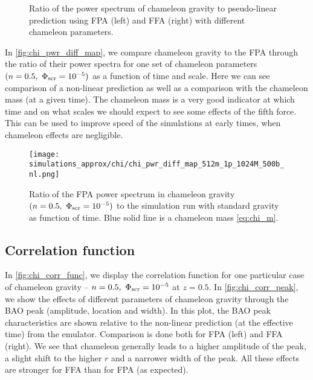 \begin{figure*}
  \centering
	\begin{subfigure}{1.2\textwidth}
		\chileft
	\end{subfigure}
	\begin{subfigure}{0.5\textwidth}
	\end{subfigure}%
	\begin{subfigure}{0.5\textwidth}
	\end{subfigure}
  \caption{Ratio of the power spectrum of chameleon gravity to pseudo-linear prediction using FPA (left) and FFA (right) with different chameleon parameters.}
  \label{fig:CHI_FP_diff_lin_ratio}
\end{figure*}

In \autoref{fig:chi_pwr_diff_map}, we compare chameleon gravity to the FPA through the ratio of their power spectra for one set of chameleon parameters $(n=0.5,\ \Phi_{\text{\scriptsize scr}}=10^{-5})$ as a function of time and scale. Here we can see comparison of a non-linear prediction as well as a comparison with the chameleon mass (at a given time). The chameleon mass is a very good indicator at which time and on what scales we should expect to see some effects of the fifth force. This can be used to improve speed of the simulations at early times, when chameleon effects are negligible.
\begin{figure}
	\centering
	\chileft
	\texttt{[image: simulations\_approx/chi/chi\_pwr\_diff\_map\_512m\_1p\_1024M\_500b\_nl.png]}
	\caption{Ratio of the FPA power spectrum in chameleon gravity $(n=0.5,\ \Phi_{\text{\scriptsize scr}}=10^{-5})$ to the simulation run with standard gravity as function of time. Blue solid line is a chameleon mass \eqref{eq:chi_m}.}
	\label{fig:chi_pwr_diff_map}
\end{figure}

\subsection{Correlation function}
In \autoref{fig:chi_corr_func}, we display the correlation function for one particular case of chameleon gravity -- $n=0.5,\ \Phi_{\text{\scriptsize scr}}=10^{-5}$ at $z=0.5$. In \autoref{fig:chi_corr_peak}, we show the effects of different parameters of chameleon gravity through the BAO peak (amplitude, location and width). In this plot, the BAO peak characteristics are shown relative to the non-linear prediction (at the effective time) from the emulator. Comparison is done both for FPA (left) and FFA (right). We see that chameleon generally leads to a higher amplitude of the peak, a slight shift to the higher $r$ and a narrower width of the peak. All these effects are stronger for FFA than for FPA (as expected).

